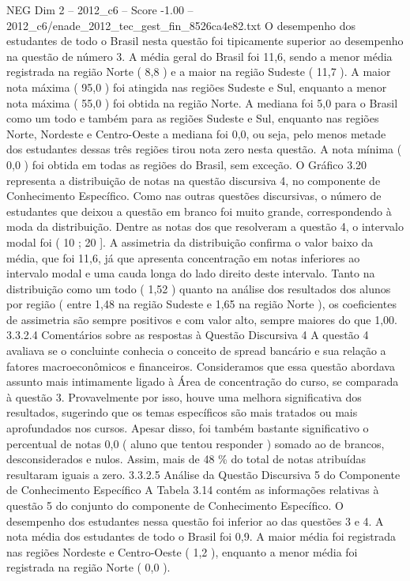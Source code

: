 \begin{textsample}{NEG Dim 2 – 2012\_c6 – Score -1.00 – 2012\_c6/enade\_2012\_tec\_gest\_fin\_8526ca4e82.txt}
O desempenho dos estudantes de todo o Brasil nesta questão foi tipicamente superior ao desempenho na questão de número 3.
A média geral do Brasil foi 11,6, sendo a menor média registrada na região Norte ( 8,8 ) e a maior na região Sudeste ( 11,7 ).
A maior nota máxima ( 95,0 ) foi atingida nas regiões Sudeste e Sul, enquanto a menor nota máxima ( 55,0 ) foi obtida na região Norte.
A mediana foi 5,0 para o Brasil como um todo e também para as regiões Sudeste e Sul, enquanto nas regiões Norte, Nordeste e Centro-Oeste a mediana foi 0,0, ou seja, pelo menos metade dos estudantes dessas três regiões tirou nota zero nesta questão.
A nota mínima ( 0,0 ) foi obtida em todas as regiões do Brasil, sem exceção.
O Gráfico 3.20 representa a distribuição de notas na questão discursiva 4, no componente de Conhecimento Específico.
Como nas outras questões discursivas, o número de estudantes que deixou a questão em branco foi muito grande, correspondendo à moda da distribuição.
Dentre as notas dos que resolveram a questão 4, o intervalo modal foi ( 10 ; 20 ].
A assimetria da distribuição confirma o valor baixo da média, que foi 11,6, já que apresenta concentração em notas inferiores ao intervalo modal e uma cauda longa do lado direito deste intervalo.
Tanto na distribuição como um todo ( 1,52 ) quanto na análise dos resultados dos alunos por região ( entre 1,48 na região Sudeste e 1,65 na região Norte ), os coeficientes de assimetria são sempre positivos e com valor alto, sempre maiores do que 1,00. 3.3.2.4 Comentários sobre as respostas à Questão Discursiva 4 A questão 4 avaliava se o concluinte conhecia o conceito de spread bancário e sua relação a fatores macroeconômicos e financeiros.
Consideramos que essa questão abordava assunto mais intimamente ligado à Área de concentração do curso, se comparada à questão 3.
Provavelmente por isso, houve uma melhora significativa dos resultados, sugerindo que os temas específicos são mais tratados ou mais aprofundados nos cursos.
Apesar disso, foi também bastante significativo o percentual de notas 0,0 ( aluno que tentou responder ) somado ao de brancos, desconsiderados e nulos.
Assim, mais de 48 \% do total de notas atribuídas resultaram iguais a zero. 3.3.2.5 Análise da Questão Discursiva 5 do Componente de Conhecimento Específico A Tabela 3.14 contém as informações relativas à questão 5 do conjunto do componente de Conhecimento Específico.
O desempenho dos estudantes nessa questão foi inferior ao das questões 3 e 4.
A nota média dos estudantes de todo o Brasil foi 0,9.
A maior média foi registrada nas regiões Nordeste e Centro-Oeste ( 1,2 ), enquanto a menor média foi registrada na região Norte ( 0,0 ).

\end{textsample}
